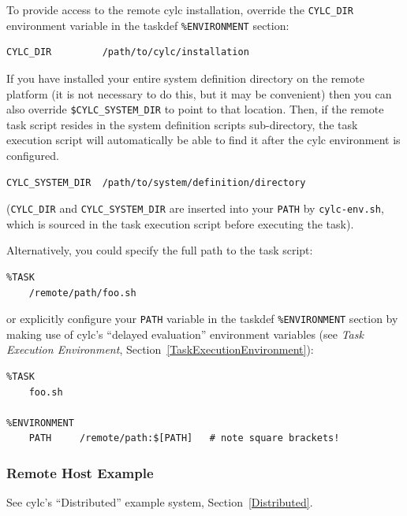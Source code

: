 \documentclass[11pt,a4paper]{article}
\begin{document}
\lstset{language=cylctaskdef}

To provide access to the remote cylc installation, override the 
\lstinline=CYLC_DIR= environment variable in the taskdef
\lstinline=%ENVIRONMENT= section:

\begin{lstlisting}
CYLC_DIR         /path/to/cylc/installation
\end{lstlisting}

If you have installed your entire system definition directory on the
remote platform (it is not necessary to do this, but it may be
convenient) then you can also override \lstinline=$CYLC_SYSTEM_DIR= to
point to that location. Then, if the remote task script resides in the
system definition scripts sub-directory, the task execution script will
automatically be able to find it after the cylc environment is
configured.

\begin{lstlisting}
CYLC_SYSTEM_DIR  /path/to/system/definition/directory
\end{lstlisting}

(\lstinline=CYLC_DIR=  and \lstinline=CYLC_SYSTEM_DIR= are inserted
into your \lstinline=PATH= by \lstinline=cylc-env.sh=, which is sourced
in the task execution script before executing the task).

Alternatively, you could specify the full path to the task script:

\begin{lstlisting}
%TASK
    /remote/path/foo.sh
\end{lstlisting}

or explicitly configure your \lstinline=PATH= variable in the taskdef
\lstinline=%ENVIRONMENT= section by making use of cylc's ``delayed
evaluation'' environment variables (see {\em Task Execution
Environment}, Section~\ref{TaskExecutionEnvironment}):

\begin{lstlisting}
%TASK
    foo.sh

%ENVIRONMENT
    PATH     /remote/path:$[PATH]   # note square brackets!
\end{lstlisting}

\subsubsection{Remote Host Example}

See cylc's ``Distributed'' example system, Section~\ref{Distributed}.
\end{document}
